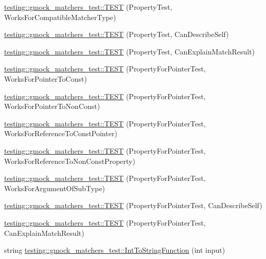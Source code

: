 \begin{DoxyCompactItemize}
\item 
\hyperlink{namespacetesting_1_1gmock__matchers__test_a17b7a59d1dbca0692ebaa71e6f46f1d6}{testing\+::gmock\+\_\+matchers\+\_\+test\+::\+T\+E\+ST} (Property\+Test, Works\+For\+Compatible\+Matcher\+Type)
\item 
\hyperlink{namespacetesting_1_1gmock__matchers__test_a8c749e210723e33547e58fe8822fb85e}{testing\+::gmock\+\_\+matchers\+\_\+test\+::\+T\+E\+ST} (Property\+Test, Can\+Describe\+Self)
\item 
\hyperlink{namespacetesting_1_1gmock__matchers__test_aff810d2cdd79c55d483965a28bb5069a}{testing\+::gmock\+\_\+matchers\+\_\+test\+::\+T\+E\+ST} (Property\+Test, Can\+Explain\+Match\+Result)
\item 
\hyperlink{namespacetesting_1_1gmock__matchers__test_ac9222439b8e0b1e080650d667044c140}{testing\+::gmock\+\_\+matchers\+\_\+test\+::\+T\+E\+ST} (Property\+For\+Pointer\+Test, Works\+For\+Pointer\+To\+Const)
\item 
\hyperlink{namespacetesting_1_1gmock__matchers__test_acc639f3cbeacf4af712bf02ac451b160}{testing\+::gmock\+\_\+matchers\+\_\+test\+::\+T\+E\+ST} (Property\+For\+Pointer\+Test, Works\+For\+Pointer\+To\+Non\+Const)
\item 
\hyperlink{namespacetesting_1_1gmock__matchers__test_a028687dfb04ec008ea129f9cc95aac62}{testing\+::gmock\+\_\+matchers\+\_\+test\+::\+T\+E\+ST} (Property\+For\+Pointer\+Test, Works\+For\+Reference\+To\+Const\+Pointer)
\item 
\hyperlink{namespacetesting_1_1gmock__matchers__test_a78762b60c9d0c985916b698e6d4c55e3}{testing\+::gmock\+\_\+matchers\+\_\+test\+::\+T\+E\+ST} (Property\+For\+Pointer\+Test, Works\+For\+Reference\+To\+Non\+Const\+Property)
\item 
\hyperlink{namespacetesting_1_1gmock__matchers__test_a4c2f4b483550e2e70b09eea3836b83e0}{testing\+::gmock\+\_\+matchers\+\_\+test\+::\+T\+E\+ST} (Property\+For\+Pointer\+Test, Works\+For\+Argument\+Of\+Sub\+Type)
\item 
\hyperlink{namespacetesting_1_1gmock__matchers__test_a064fc5dd5ca0106e8ed0fbc483472186}{testing\+::gmock\+\_\+matchers\+\_\+test\+::\+T\+E\+ST} (Property\+For\+Pointer\+Test, Can\+Describe\+Self)
\item 
\hyperlink{namespacetesting_1_1gmock__matchers__test_a1a7e2a9641a06e492d58c75d900330d3}{testing\+::gmock\+\_\+matchers\+\_\+test\+::\+T\+E\+ST} (Property\+For\+Pointer\+Test, Can\+Explain\+Match\+Result)
\item 
string \hyperlink{namespacetesting_1_1gmock__matchers__test_a2399c4fae49f898c02f57a42047d80f2}{testing\+::gmock\+\_\+matchers\+\_\+test\+::\+Int\+To\+String\+Function} (int input)

\end{DoxyCompactItemize}
